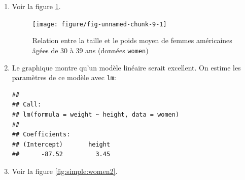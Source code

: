 \begin{solution}{2.3}
    \begin{enumerate}
    \item Voir la figure \ref{fig:simple:women}.
      \begin{figure}
        \centering
\begin{knitrout}
\color{fgcolor}\begin{kframe}
\begin{alltt}
 \hlopt{~}     \hlstd{=} \hlstd{)}
\end{alltt}
\end{kframe}

{\centering \texttt{[image: figure/fig-unnamed-chunk-9-1]}

}



\end{knitrout}
        \caption{Relation entre la taille et le poids moyen de femmes américaines âgées de 30 à 39 ans (données \texttt{women})}
        \label{fig:simple:women}
      \end{figure}
    \item Le graphique montre qu'un modèle linéaire serait
      excellent. On estime les paramètres de ce modèle avec \texttt{lm}:
\begin{knitrout}
\color{fgcolor}\begin{kframe}
\begin{alltt}
 \hlkwb{<-}  \hlopt{~}   
\end{alltt}
\begin{verbatim}
##
## Call:
## lm(formula = weight ~ height, data = women)
##
## Coefficients:
## (Intercept)       height
##      -87.52         3.45
\end{verbatim}
\end{kframe}
\end{knitrout}
    \item Voir la figure \ref{fig:simple:women2}.
      \begin{figure}
        \centering
\begin{knitrout}
\color{fgcolor}\begin{kframe}
\begin{alltt}
\end{alltt}
\end{kframe}
\end{knitrout}
\begin{knitrout}
\color{fgcolor}


\end{knitrout}
\end{figure}
\end{enumerate}
\end{solution}
